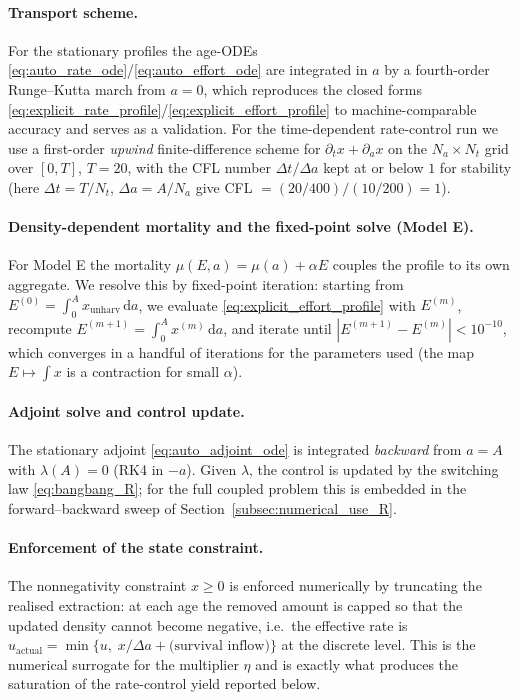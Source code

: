 \documentclass[pdflatex,sn-mathphys-num]{sn-jnl}
\theoremstyle{definition}
\theoremstyle{remark}
\newcommand{\dd}{\,\mathrm{d}}
\begin{document}
\paragraph{Transport scheme.}
For the stationary profiles the age-ODEs
\eqref{eq:auto_rate_ode}/\eqref{eq:auto_effort_ode} are integrated in $a$ by a
fourth-order Runge--Kutta march from $a=0$, which reproduces the closed forms
\eqref{eq:explicit_rate_profile}/\eqref{eq:explicit_effort_profile} to
machine-comparable accuracy and serves as a validation. For the
time-dependent rate-control run we use a first-order \emph{upwind}
finite-difference scheme for $\partial_t x+\partial_a x$ on the
$N_a\times N_t$ grid over $[0,T]$, $T=20$, with the CFL number
$\Delta t/\Delta a$ kept at or below $1$ for stability (here
$\Delta t=T/N_t$, $\Delta a=A/N_a$ give CFL $=(20/400)/(10/200)=1$).

\paragraph{Density-dependent mortality and the fixed-point solve (Model E).}
For Model E the mortality $\mu(E,a)=\mu(a)+\alpha E$ couples the profile to
its own aggregate. We resolve this by fixed-point iteration: starting from
$E^{(0)}=\int_0^A x_{\text{unharv}}\dd a$, we evaluate
\eqref{eq:explicit_effort_profile} with $E^{(m)}$, recompute
$E^{(m+1)}=\int_0^A x^{(m)}\dd a$, and iterate until
$|E^{(m+1)}-E^{(m)}|<10^{-10}$, which converges in a handful of iterations for
the parameters used (the map $E\mapsto\int x$ is a contraction for small
$\alpha$).

\paragraph{Adjoint solve and control update.}
The stationary adjoint \eqref{eq:auto_adjoint_ode} is integrated
\emph{backward} from $a=A$ with $\lambda(A)=0$ (RK4 in $-a$). Given $\lambda$,
the control is updated by the switching law \eqref{eq:bangbang_R}; for the
full coupled problem this is embedded in the forward--backward sweep of
Section~\ref{subsec:numerical_use_R}.

\paragraph{Enforcement of the state constraint.}
The nonnegativity constraint $x\ge0$ is enforced numerically by truncating the
realised extraction: at each age the removed amount is capped so that the
updated density cannot become negative, i.e.\ the effective rate is
$u_{\text{actual}}=\min\{u,\;x/\Delta a + \text{(survival inflow)}\}$ at the
discrete level. This is the numerical surrogate for the multiplier $\eta$ and
is exactly what produces the saturation of the rate-control yield reported
below.
\end{document}
